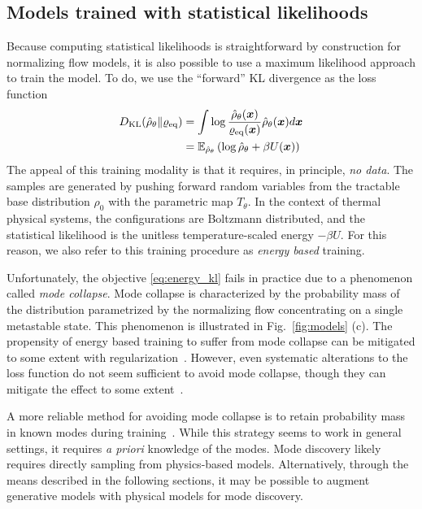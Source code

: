 \documentclass[11pt]{article}
\begin{document}
\subsection{Models trained with statistical likelihoods} \label{sec:nfs}

Because computing statistical likelihoods is straightforward by construction for normalizing flow models, it is also possible to use a maximum likelihood approach to train the model. 
To do, we use the ``forward'' KL divergence as the loss function
\begin{equation}
\begin{aligned}
    D_{\rm KL}(\hat\rho_{\theta} \| \varrho_{\rm eq}) &= \int \log \frac{\hat\rho_{\theta}(\boldsymbol{x})}{\varrho_{\rm eq}(\boldsymbol{x})} \hat\rho_{\theta}(\boldsymbol{x}) d\boldsymbol{x} \\
    &= \mathbb{E}_{\hat\rho_\theta} \left( \log \hat\rho_{\theta} + \beta U(\boldsymbol{x}) \right)
    \label{eq:energy_kl}
\end{aligned}
\end{equation}
The appeal of this training modality is that it requires, in principle, \emph{no data}.
The samples are generated by pushing forward random variables from the tractable base distribution $\rho_0$ with the parametric map $T_{\theta}$.
In the context of thermal physical systems, the configurations are Boltzmann distributed, and the statistical likelihood is the unitless temperature-scaled energy $-\beta U.$
For this reason, we also refer to this training procedure as \textit{energy based} training.

Unfortunately, the objective \eqref{eq:energy_kl} fails in practice due to a phenomenon called \textit{mode collapse}. 
Mode collapse is characterized by the probability mass of the distribution parametrized by the normalizing flow concentrating on a single metastable state.
This phenomenon is illustrated in Fig.~\ref{fig:models} (c).
The propensity of energy based training to suffer from mode collapse can be mitigated to some extent with regularization~\cite{deldebbio_efficient_2021}.
However, even systematic alterations to the loss function do not seem sufficient to avoid mode collapse, though they can mitigate the effect to some extent~\cite{felardos_designing_2023}.

A more reliable method for avoiding mode collapse is to retain probability mass in known modes during training~\cite{gabrie_adaptive_2022}.
While this strategy seems to work in general settings, it requires \emph{a priori} knowledge of the modes.
Mode discovery likely requires directly sampling from physics-based models.
Alternatively, through the means described in the following sections, it may be possible to augment generative models with physical models for mode discovery. 
\end{document}
